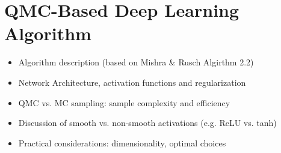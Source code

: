 \chapter{QMC-Based Deep Learning Algorithm}

\begin{itemize}
    \item Algorithm description (based on Mishra \& Rusch Algirthm 2.2)
    \item Network Architecture, activation functions and regularization
    \item QMC vs. MC sampling: sample complexity and efficiency
    \item Discussion of smooth vs. non-smooth activations (e.g. ReLU vs. tanh)
    \item Practical considerations: dimensionality, optimal choices
\end{itemize}
